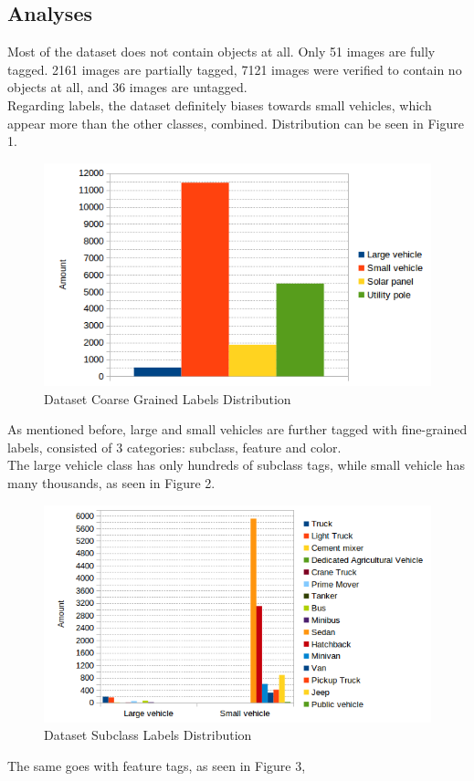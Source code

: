 \documentclass[]{article}
\begin{document}
\subsection{Analyses}
Most of the dataset does not contain objects at all. Only 51 images are fully tagged. 2161 images are partially tagged, 7121 images were verified to contain no objects at all, and 36 images are untagged.\\
Regarding labels, the dataset definitely biases towards small vehicles, which appear more than the other classes, combined. Distribution can be seen in Figure 1.
\begin{figure}[!h]
\centering
\includegraphics[width=0.7\linewidth]{"charts/Dataset Coarse Grained Labels Distribution"}
\caption{Dataset Coarse Grained Labels Distribution}
\label{fig:Dataset Coarse Grained Labels Distribution}
\end{figure}
As mentioned before, large and small vehicles are further tagged with fine-grained labels, consisted of 3 categories: subclass, feature and color.\\
The large vehicle class has only hundreds of subclass tags, while small vehicle has many thousands, as seen in Figure 2.
\begin{figure}[!h]
\centering
\includegraphics[width=0.7\linewidth]{"charts/Dataset Subclass Labels Distribution"}
\caption{Dataset Subclass Labels Distribution}
\label{fig:Dataset Subclass Labels Distribution}
\end{figure}
The same goes with feature tags, as seen in Figure 3,
\end{document}
